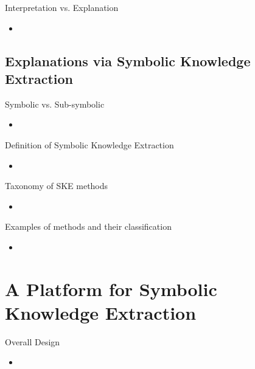 \documentclass[presentation]{beamer}\mode<presentation>{\usetheme{AMSBolognaFC}}
\begin{document}
\begin{frame}{Interpretation vs. Explanation}
    \begin{itemize}
        \item 
    \end{itemize}
\end{frame}

\subsection{Explanations via Symbolic Knowledge Extraction}

\begin{frame}{Symbolic vs. Sub-symbolic}
    \begin{itemize}
        \item 
    \end{itemize}
\end{frame}

\begin{frame}{Definition of Symbolic Knowledge Extraction}
    \begin{itemize}
        \item 
    \end{itemize}
\end{frame}

\begin{frame}{Taxonomy of SKE methods}
    \begin{itemize}
        \item 
    \end{itemize}
\end{frame}

\begin{frame}{Examples of methods and their classification}
    \begin{itemize}
        \item 
    \end{itemize}
\end{frame}

\section{A Platform for Symbolic Knowledge Extraction}

\begin{frame}{Overall Design}
    \begin{itemize}
        \item 
    \end{itemize}
\end{frame}
\end{document}
